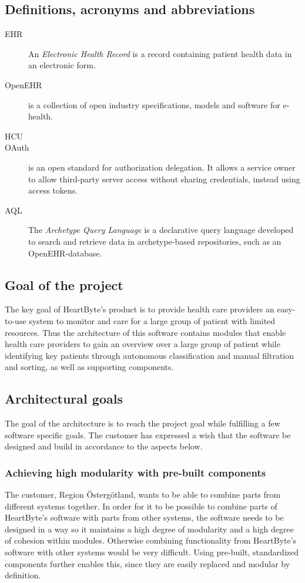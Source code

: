 \documentclass{article}
\begin{document}
\subsection{Definitions, acronyms and abbreviations}
\begin{description}
\item [EHR] An \emph{Electronic Health Record} is a record containing patient health data in an electronic form.
\item [OpenEHR] is a collection of open industry specifications, models and software for e-health.
\item [HCU] 
\item [OAuth] is an open standard for authorization delegation. It allows a service owner to allow third-party server access without sharing credentials, instead using access tokens. 
\item [AQL] The \emph{Archetype Query Language} is a declarative query language developed to search and retrieve data in archetype-based repositories, such as an OpenEHR-database.
\end{description}

\subsection{Goal of the project}
The key goal of HeartByte's product is to provide health care providers an easy-to-use system to monitor and care for a large group of patient with limited resources. Thus the architecture of this software contains modules that enable health care providers to gain an overview over a large group of patient while identifying key patients through autonomous classification and manual filtration and sorting, as well as supporting components.

\subsection{Architectural goals}
The goal of the architecture is to reach the project goal while fulfilling a few software specific goals. The customer has expressed a wish that the software be designed and build in accordance to the aspects below.

\subsubsection{Achieving high modularity with pre-built components}
The customer, Region Östergötland, wants to be able to combine parts from different systems together. In order for it to be possible to combine parts of HeartByte's software with parts from other systems, the software needs to be designed in a way so it maintains a high degree of modularity and a high degree of cohesion within modules. Otherwise combining functionality from HeartByte's software with other systems would be very difficult. Using pre-built, standardized components further enables this, since they are easily replaced and modular by definition.
\end{document}
